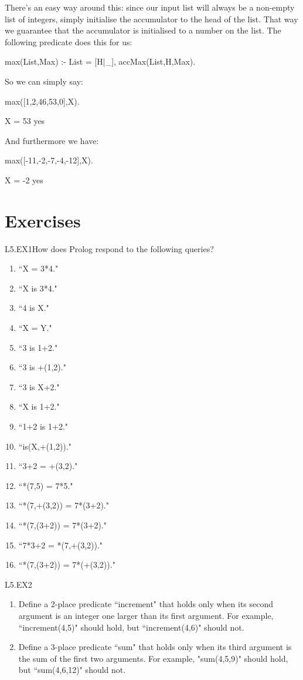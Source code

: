 There's an easy way around this: since our input list will always be a
non-empty list of integers, simply initialise the accumulator to the
head of the list.  That way we guarantee that the accumulator is
initialised to a number on the list.  The following predicate does
this for us:
\begin{LPNcodedisplay}
max(List,Max) :-
     List = [H|_],
     accMax(List,H,Max).
\end{LPNcodedisplay}
So we can simply say:
\begin{LPNcodedisplay}
max([1,2,46,53,0],X).

X = 53
yes
\end{LPNcodedisplay}
And furthermore we have:
\begin{LPNcodedisplay}
max([-11,-2,-7,-4,-12],X).

X = -2
yes
\end{LPNcodedisplay}


\newpage
\section{Exercises}\label{SEC.L5.EXERCISES}

\begin{LPNexercise}{L5.EX1}How does Prolog respond to the following queries?
\begin{enumerate}
\item{}``X = 3*4."
\item{}``X is 3*4."
\item{}``4 is X."
\item{}``X = Y."
\item{}``3 is 1+2."
\item{}``3 is +(1,2)."
\item{}``3 is X+2."
\item{}``X is 1+2."
\item{}``1+2 is 1+2."
\item{}``is(X,+(1,2))."
\item{}``3+2 = +(3,2)."
\item{}``*(7,5) = 7*5."
\item{}``*(7,+(3,2)) = 7*(3+2)."
\item{}``*(7,(3+2)) = 7*(3+2)."
\item{}``7*3+2 = *(7,+(3,2))."
\item{}``*(7,(3+2)) = 7*(+(3,2))."
\end{enumerate}
\end{LPNexercise}
\begin{LPNexercise}{L5.EX2}\begin{enumerate}
\item{}Define a 2-place predicate ``increment" that holds only when its
second argument is an integer one larger than its first argument.  For
example, ``increment(4,5)" should hold, but ``increment(4,6)"
should not.
\item{}Define a 3-place predicate ``sum" that holds only when its third
argument is the sum of the first two arguments. For example,
"sum(4,5,9)" should hold, but ``sum(4,6,12)" should
not.
\end{enumerate}
\end{LPNexercise}

